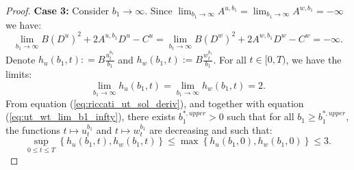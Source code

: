 \documentclass[11pt]{article}
\begin{document}
\begin{proof}
	\textbf{Case 3:} Consider $b_1 \to \infty$. Since $\lim_{b_1 \to \infty} A^{u,b_1} = \lim_{b_1 \to \infty} A^{w,b_1} = - \infty$ we have:
	$$\lim_{b_1 \to \infty}B (D^{u})^2 + 2 A^{u,b_1} D^{u} - C^{u} = \lim_{b_1 \to \infty}B (D^{w})^2 + 2 A^{w,b_1} D^{w} - C^{w}=-\infty.$$
	Denote $h_u(b_1,t): = B \frac{u_t^{b_1}}{b_1}$ and $h_w(b_1,t) := B \frac{w_t^{b_1}}{b_1}$. For all $t \in [0,T)$, we have the limits:
	\begin{equation}
		\lim_{b_1 \to \infty} h_u(b_1,t) =  \lim_{b_1 \to \infty} h_w(b_1,t) = 2.
	\label{eq:ut_wt_lim_b1_infty}
	\end{equation}
	From equation (\ref{eq:riccati_ut_sol_deriv}), and together with equation (\ref{eq:ut_wt_lim_b1_infty}), there exists $b_1^{*,upper} >0$ such that for all $b_1 \geq b_1^{*,upper}$, the functions $t \mapsto u_t^{b_1}$ and $t \mapsto w_t^{b_1}$ are decreasing and such that:
	$$ \sup_{0 \leq t \leq T} \left\{ h_u(b_1, t), h_w(b_1,t)\right\} \leq \max \left\{ h_u(b_1, 0), h_w(b_1,0) \right\} \leq 3.$$
	

\end{proof}
\end{document}
